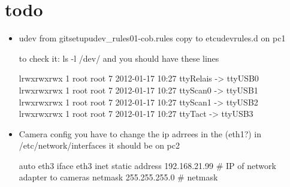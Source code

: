 \section{todo}
\begin{itemize}
\item {udev from git\/setup\/udev\_rules\/01-cob.rules copy to \/etc\/udev\/rules.d on pc1}

to check it: ls -l /dev/ and you should have these lines

lrwxrwxrwx 1 root root           7 2012-01-17 10:27 ttyRelais -> ttyUSB0\\
lrwxrwxrwx 1 root root           7 2012-01-17 10:27 ttyScan0 -> ttyUSB1\\
lrwxrwxrwx 1 root root           7 2012-01-17 10:27 ttyScan1 -> ttyUSB2\\
lrwxrwxrwx 1 root root           7 2012-01-17 10:27 ttyTact -> ttyUSB3\\



\item {Camera config you have to change the ip adrrees in the (eth1?) in /etc/network/interfaces it should be on pc2}


auto eth3
iface eth3 inet static
address 192.168.21.99   \# IP of network adapter to cameras
netmask 255.255.255.0   \# netmask

\end{itemize}